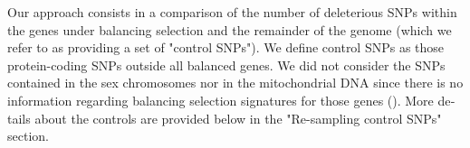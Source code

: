 \begin{refsection}
\begin{otherlanguage}{english}


Our approach consists in a comparison of the number of deleterious SNPs within the genes under balancing selection and the remainder of the genome (which we refer to as providing a set of "control SNPs"). We define control SNPs as those protein-coding SNPs outside all balanced genes. We did not consider the SNPs contained in the sex chromosomes nor in the mitochondrial DNA since there is no information regarding balancing selection signatures for those genes (\cite{Bitarello2016}). More details about the controls are provided below in the "Re-sampling control SNPs" section. %



\end{otherlanguage}
\end{refsection}
